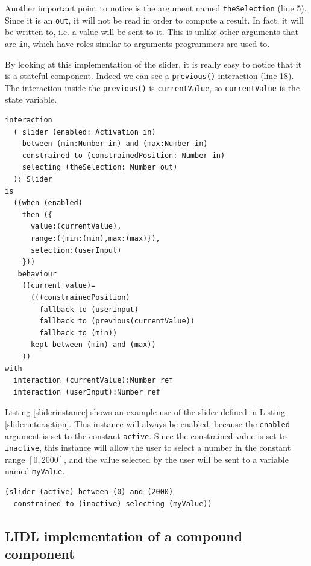 \documentclass[10pt]{sigplanconf}
\newcommand{\code}[1]{\lstinline{#1}}
\begin{document}
Another important point to notice is the argument named \code{theSelection} (line 5). Since it is an \code{out}, it will not be read in order to compute a result. In fact, it will be written to, i.e. a value will be sent to it. This is unlike other arguments that are \code{in}, which have roles similar to arguments programmers are used to.

By looking at this implementation of the slider, it is really easy to notice that it is a stateful component. Indeed we can see a \code{previous()} interaction (line 18). The interaction inside the \code{previous()} is \code{currentValue}, so \code{currentValue} is the state variable.

\begin{lstlisting}[caption=The definition of an abstract slider interaction,label=sliderinteraction]
interaction 
  ( slider (enabled: Activation in)
    between (min:Number in) and (max:Number in)
    constrained to (constrainedPosition: Number in)
    selecting (theSelection: Number out)
  ): Slider
is
  ((when (enabled) 
    then ({
      value:(currentValue),
      range:({min:(min),max:(max)}),
      selection:(userInput)
    }))
   behaviour 
    ((current value)=
      (((constrainedPosition)
        fallback to (userInput) 
        fallback to (previous(currentValue)) 
        fallback to (min))
      kept between (min) and (max))
    ))
with
  interaction (currentValue):Number ref
  interaction (userInput):Number ref
\end{lstlisting}


Listing \ref{sliderinstance} shows an example use of the slider defined in Listing \ref{sliderinteraction}. This instance will always be enabled, because the \code{enabled} argument is set to the constant \code{active}. Since the constrained value is set to \code{inactive}, this instance will allow the user to select a number in the constant range $[0,2000]$, and the value selected by the user will be sent to a variable named \code{myValue}.


\begin{lstlisting}[caption=An instance of the abstract slider,label=sliderinstance]
(slider (active) between (0) and (2000) 
  constrained to (inactive) selecting (myValue))
\end{lstlisting}


\subsection{LIDL implementation of a compound component}
\end{document}
